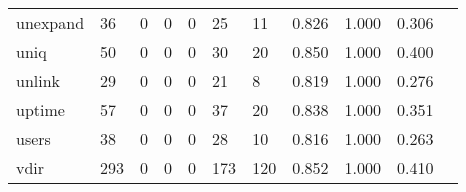 \begin{longtable}{lp{1.2cm}p{1.2cm}p{1.2cm}p{1.2cm}p{1.2cm}p{1.2cm}p{1.2cm}p{1.2cm}p{1.2cm}p{1.2cm}}
unexpand  &                                    36 &                                                  0 &                                                  0 &                                                  0 &                                                 25 &                                                 11 &                                              0.826 &                                              1.000 &                                              0.306 \\
uniq      &                                    50 &                                                  0 &                                                  0 &                                                  0 &                                                 30 &                                                 20 &                                              0.850 &                                              1.000 &                                              0.400 \\
unlink    &                                    29 &                                                  0 &                                                  0 &                                                  0 &                                                 21 &                                                  8 &                                              0.819 &                                              1.000 &                                              0.276 \\
uptime    &                                    57 &                                                  0 &                                                  0 &                                                  0 &                                                 37 &                                                 20 &                                              0.838 &                                              1.000 &                                              0.351 \\
users     &                                    38 &                                                  0 &                                                  0 &                                                  0 &                                                 28 &                                                 10 &                                              0.816 &                                              1.000 &                                              0.263 \\
vdir      &                                   293 &                                                  0 &                                                  0 &                                                  0 &                                                173 &                                                120 &                                              0.852 &                                              1.000 &                                              0.410 \\

\end{longtable}
